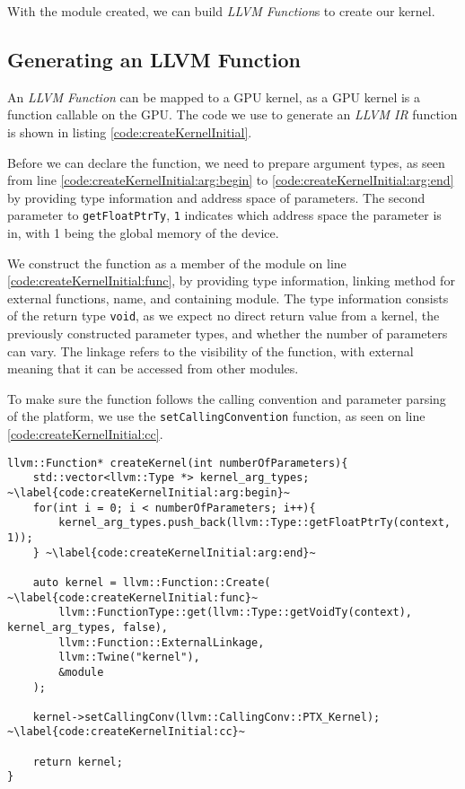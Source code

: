 With the module created, we can build \textit{LLVM Function}s to create our kernel.

\subsection{Generating an LLVM Function} \label{sec:irFunction}
An \textit{LLVM Function} can be mapped to a GPU kernel, as a GPU kernel is a function callable on the GPU. The code we use to generate an \textit{LLVM IR} function is shown in listing \ref{code:createKernelInitial}. 

Before we can declare the function, we need to prepare argument types, as seen from line \ref{code:createKernelInitial:arg:begin} to \ref{code:createKernelInitial:arg:end} by providing type information and address space of parameters. The second parameter to \texttt{getFloatPtrTy}, \texttt{1} indicates which address space the parameter is in, with 1 being the global memory of the device.

We construct the function as a member of the module on line \ref{code:createKernelInitial:func}, by providing type information, linking method for external functions, name, and containing module. The type information consists of the return type \texttt{void}, as we expect no direct return value from a kernel, the previously constructed parameter types, and whether the number of parameters can vary. The linkage refers to the visibility of the function, with external meaning that it can be accessed from other modules.

To make sure the function follows the calling convention and parameter parsing of the platform, we use the \texttt{setCallingConvention} function, as seen on line \ref{code:createKernelInitial:cc}. 

\begin{lstlisting}[caption={The createKernel function.}, label={code:createKernelInitial}]
llvm::Function* createKernel(int numberOfParameters){
    std::vector<llvm::Type *> kernel_arg_types; ~\label{code:createKernelInitial:arg:begin}~
    for(int i = 0; i < numberOfParameters; i++){
        kernel_arg_types.push_back(llvm::Type::getFloatPtrTy(context, 1));
    } ~\label{code:createKernelInitial:arg:end}~

    auto kernel = llvm::Function::Create( ~\label{code:createKernelInitial:func}~
        llvm::FunctionType::get(llvm::Type::getVoidTy(context), kernel_arg_types, false),
        llvm::Function::ExternalLinkage,
        llvm::Twine("kernel"),
        &module
    );

    kernel->setCallingConv(llvm::CallingConv::PTX_Kernel); ~\label{code:createKernelInitial:cc}~

    return kernel;
}
\end{lstlisting}

